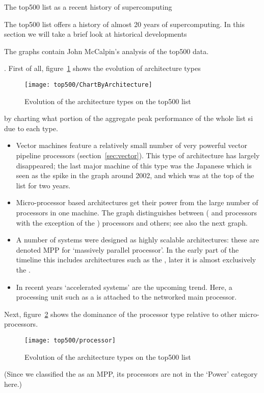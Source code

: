  {The top500 list as a recent history of supercomputing}

The top500 list offers a history of almost 20 years of
supercomputing. In this section we will take a brief look at
historical developments
\begin{footnoteenv}
  {The graphs contain John McCalpin's
    analysis of the top500 data.}
\end{footnoteenv}%
. First of all,
figure~\ref{fig:top500-types} shows the evolution of architecture types
\begin{figure}[ht]
  \texttt{[image: top500/ChartByArchitecture]}
  \caption{Evolution of the architecture types on the top500 list}
  \label{fig:top500-types}
\end{figure}
by charting what portion of the aggregate peak performance of the
whole list si due to each type.
\begin{itemize}
\item Vector machines feature a relatively small number of very powerful vector
  pipeline processors (section~\ref{sec:vector}). This type of
  architecture has largely disappeared; the last major machine of this
  type was the Japanese  which is seen as
  the spike in the graph around 2002, and which was at the top of the
  list for two years.
\item Micro-processor based architectures get their power from the
  large number of processors in one machine. The graph distinguishes
  between  ( and 
  processors with the exception of the )
  processors and others; see also the next graph.
\item A number of systems were designed as highly scalable
  architectures: these are denoted MPP for `massively parallel
  processor'. In the early part of the timeline this includes
  architectures such as the , later it
  is almost exclusively the .
\item In recent years `accelerated systems' are the upcoming
  trend. Here, a processing unit such as a  is attached
  to the networked main processor.
\end{itemize}
Next, figure~\ref{fig:top500-processor} shows the dominance of the
 processor type relative to other micro-processors.
\begin{figure}[ht]
  \texttt{[image: top500/processor]}
  \caption{Evolution of the architecture types on the top500 list}
  \label{fig:top500-processor}
\end{figure}
(Since we classified the  as an MPP, its
processors are not in the `Power' category here.)


